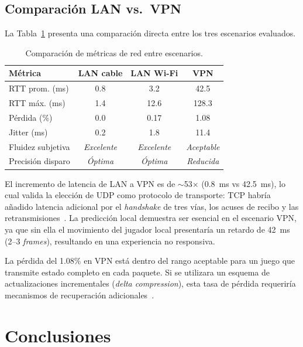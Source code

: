 \documentclass[conference]{IEEEtran}
\begin{document}
\subsection{Comparaci\'on LAN vs.\ VPN}

La Tabla~\ref{tab:comparison} presenta una comparaci\'on directa entre los tres escenarios evaluados.

\begin{table}[!h]
\centering
\caption{Comparaci\'on de m\'etricas de red entre escenarios.}
\label{tab:comparison}
\begin{tabular}{@{}lccc@{}}
\toprule
\textbf{M\'etrica} & \textbf{LAN cable} & \textbf{LAN Wi-Fi} & \textbf{VPN} \\
\midrule
RTT prom. (ms)      & 0.8  & 3.2   & 42.5   \\
RTT m\'ax. (ms)     & 1.4  & 12.6  & 128.3  \\
P\'erdida (\%)      & 0.0  & 0.17  & 1.08   \\
Jitter (ms)         & 0.2  & 1.8   & 11.4   \\
Fluidez subjetiva   & \textit{Excelente} & \textit{Excelente} & \textit{Aceptable} \\
Precisi\'on disparo & \textit{\'Optima}   & \textit{\'Optima}   & \textit{Reducida}  \\
\bottomrule
\end{tabular}
\end{table}

El incremento de latencia de LAN a VPN es de $\sim$53$\times$ (0.8~ms vs 42.5~ms), lo cual valida la elecci\'on de UDP como protocolo de transporte: TCP habr\'ia a\~nadido latencia adicional por el \textit{handshake} de tres v\'ias, los acuses de recibo y las retransmisiones~\cite{kurose2017}. La predicci\'on local demuestra ser esencial en el escenario VPN, ya que sin ella el movimiento del jugador local presentar\'ia un retardo de 42~ms (2--3 \textit{frames}), resultando en una experiencia no responsiva.

La p\'erdida del 1.08\% en VPN est\'a dentro del rango aceptable para un juego que transmite estado completo en cada paquete. Si se utilizara un esquema de actualizaciones incrementales (\textit{delta compression}), esta tasa de p\'erdida requerir\'ia mecanismos de recuperaci\'on adicionales~\cite{gambetta2018}.

\section{Conclusiones}
\end{document}
